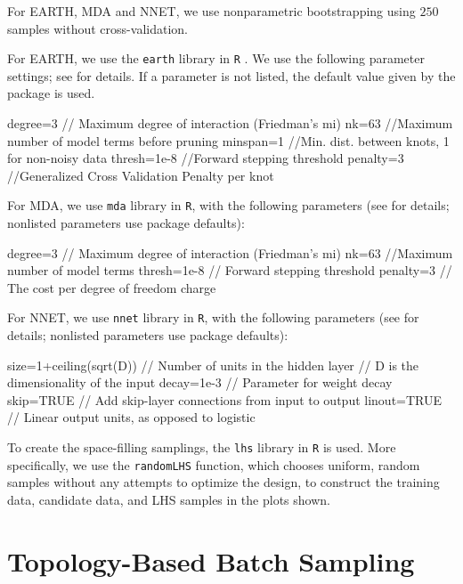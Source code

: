 For EARTH, MDA and NNET, we use nonparametric bootstrapping using $250$ samples without cross-validation.

For EARTH, we use the \texttt{earth} library in \texttt{R} \cite{earth}.
%
We use the following parameter settings; see \cite{earth} for details.
%
If a parameter is not listed, the default value given by the package is used.
%
\begin{code}
degree=3 // Maximum degree of interaction (Friedman's mi)
nk=63  //Maximum number of model terms before pruning
minspan=1 //Min. dist. between knots, 1 for non-noisy data
thresh=1e-8  //Forward stepping threshold
penalty=3 //Generalized Cross Validation Penalty per knot
\end{code}

For MDA, we use \texttt{mda} library in \texttt{R}, with the following parameters (see \cite{mda} for details; nonlisted parameters use package defaults):
\begin{code}
degree=3 // Maximum degree of interaction (Friedman's mi)
nk=63  //Maximum number of model terms
thresh=1e-8 // Forward stepping threshold
penalty=3 // The cost per degree of freedom charge
\end{code}

For NNET, we use \texttt{nnet} library in \texttt{R}, with the following parameters (see \cite{nnet} for details; nonlisted parameters use package defaults):
\begin{code}
size=1+ceiling(sqrt(D)) // Number of units in the hidden layer
                        // D is the dimensionality of the input
decay=1e-3 // Parameter for weight decay
skip=TRUE // Add skip-layer connections from input to output
linout=TRUE // Linear output units, as opposed to logistic
\end{code}

To create the space-filling samplings, the \texttt{lhs} library in \texttt{R} \cite{lhs} is used.
%
More specifically, we use the \texttt{randomLHS} function, which chooses uniform, random samples without any attempts to optimize the design, to construct the training data, candidate data, and LHS samples in the plots shown.


\section{Topology-Based Batch Sampling}
\label{paper:batch}

